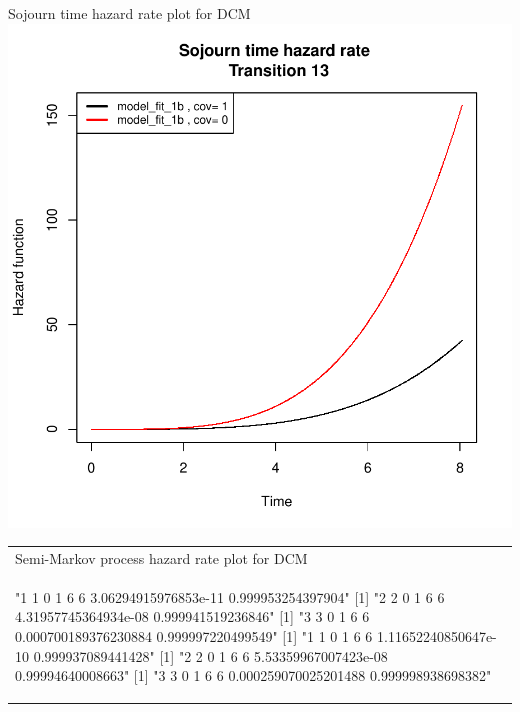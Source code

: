 \documentclass[11pt,a4paper]{article}
\begin{document}
\begin{enumerate}
\begin{minipage}{0.45\textwidth}
Sojourn time hazard rate plot for DCM\\
\includegraphics{SemiMarkov_Paper-014}
\end{minipage}%
\begin{minipage}{0.45\textwidth}
\begin{tabular}{|p{\textwidth}}
Semi-Markov process hazard rate plot for DCM\\
\begin{Schunk}
\begin{Soutput}
[1] "1 1 0 1 6 6 3.06294915976853e-11 0.999953254397904"
[1] "2 2 0 1 6 6 4.31957745364934e-08 0.999941519236846"
[1] "3 3 0 1 6 6 0.000700189376230884 0.999997220499549"
[1] "1 1 0 1 6 6 1.11652240850647e-10 0.999937089441428"
[1] "2 2 0 1 6 6 5.53359967007423e-08 0.99994640008663"
[1] "3 3 0 1 6 6 0.000259070025201488 0.999998938698382"
\end{Soutput}
\end{Schunk}

\end{tabular}
\end{minipage}
\end{enumerate}
\end{document}
